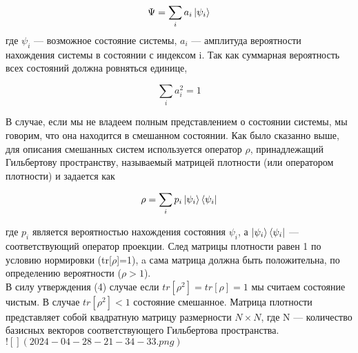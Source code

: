 \documentclass[a4paper, 10pt]{article}
\begin{document}
        \begin{equation}\label{link name}
            \Psi = \sum_i a_i \ket{\psi_i}
        \end{equation}
        где $\psi_i$ --- возможное состояние системы, $a_i$ --- амплитуда вероятности нахождения системы в состоянии с индексом i. Так как суммарная 
        вероятность всех состояний должна ровняться единице,
        
        \begin{equation}\label{link name}
            \sum_{i} a_i^2 = 1
        \end{equation}

        В случае, если мы не владеем полным представлением о состоянии системы, мы говорим, что она находится в смешанном состоянии. Как было сказанно выше,
        для описания смешанных систем используется оператор $\rho$, принадлежащий Гильбертову пространству, называемый матрицей плотности (или оператором 
        плотности) и задается как

        \begin{equation}\label{link name}
            \rho = \sum_i p_i \ket{\psi_i} \bra{\psi_i}
        \end{equation}

        где $p_i$ является вероятностью нахождения состояния $\psi_i$, а $\ket{\psi_i}\bra{\psi_i}$ --- соответствующий оператор проекции.
        След матрицы плотности равен 1 по условию нормировки (tr[$\rho$]=1), a сама матрица должна быть положительна, 
        по определению вероятности ($\rho > 1$). \\
        В силу утверждения (4) случае если $tr[\rho^2] = tr[\rho] = 1$ мы считаем состояние чистым. В случае $tr[\rho^2] < 1$ состояние смешанное.
        Матрица плотности представляет собой квадратную матрицу размерности $N \times N$, где N --- количество базисных векторов соответствующего 
        Гильбертова пространства.
        $![](2024-04-28-21-34-33.png)$
\end{document}
